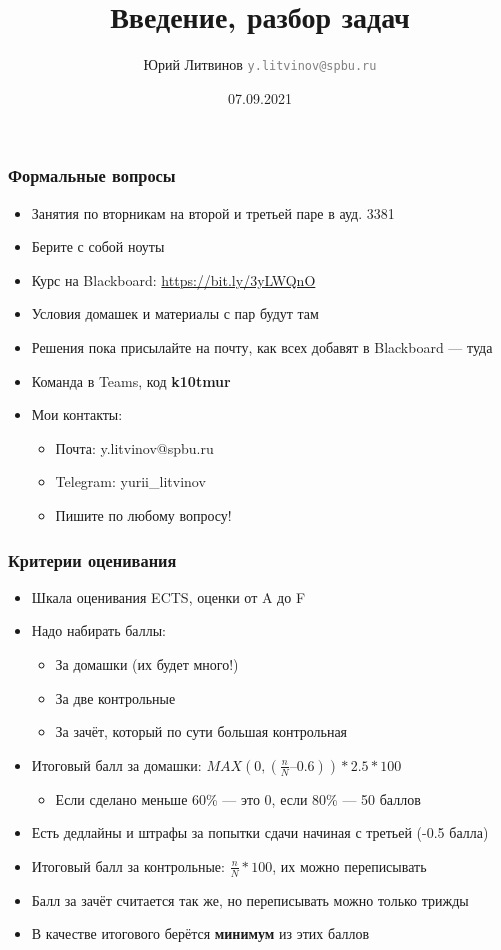 \documentclass[xetex,mathserif,serif]{beamer}
\title{Введение, разбор задач}
\author[Юрий Литвинов]{Юрий Литвинов \newline \textcolor{gray}{\small\texttt{y.litvinov@spbu.ru}}}
\date{07.09.2021}
\begin{document}
    \frame{\titlepage}

    \begin{frame}
        \frametitle{Формальные вопросы}
        \begin{itemize}
            \item Занятия по вторникам на второй и третьей паре в ауд. 3381
            \item Берите с собой ноуты
            \item Курс на Blackboard: \url{https://bit.ly/3yLWQnO}
            \item Условия домашек и материалы с пар будут там
            \item Решения пока присылайте на почту, как всех добавят в Blackboard --- туда
            \item Команда в Teams, код \textbf{k10tmur}
            \item Мои контакты:
            \begin{itemize}
                \item Почта: y.litvinov@spbu.ru
                \item Telegram: yurii\_litvinov
                \item Пишите по любому вопросу!
            \end{itemize}
        \end{itemize}
    \end{frame}

    \begin{frame}
        \frametitle{Критерии оценивания}
        \begin{itemize}
            \item Шкала оценивания ECTS, оценки от A до F
            \item Надо набирать баллы:
            \begin{itemize}
                \item За домашки (их будет много!)
                \item За две контрольные
                \item За зачёт, который по сути большая контрольная
            \end{itemize}
            \item Итоговый балл за домашки: $MAX(0, (\frac{n}{N} – 0.6)) * 2.5 * 100$
            \begin{itemize}
                \item Если сделано меньше 60\% --- это 0, если 80\% --- 50 баллов
            \end{itemize}
            \item Есть дедлайны и штрафы за попытки сдачи начиная с третьей (-0.5 балла)
            \item Итоговый балл за контрольные: $\frac{n}{N} * 100$, их можно переписывать
            \item Балл за зачёт считается так же, но переписывать можно только трижды
            \item В качестве итогового берётся \textbf{минимум} из этих баллов
        \end{itemize}
    \end{frame}
\end{document}
